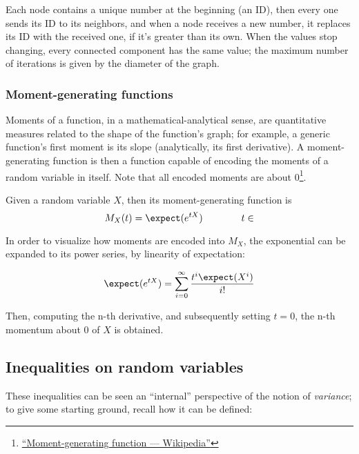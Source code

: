 \begin{example}
    Each node contains a unique number at the beginning (an ID), then every one sends its ID to its neighbors, and when a node receives a new number, it replaces its ID with the received one, if it's greater than its own. When the values stop changing, every connected component has the same value; the maximum number of iterations is given by the diameter of the graph.
\end{example}


\subsubsection{Moment-generating functions}
	
Moments of a function, in a mathematical-analytical sense, are quantitative measures related to the shape of the function's graph; for example, a generic function's first moment is its slope (analytically, its first derivative). A moment-generating function is then a function capable of encoding the moments of a random variable in itself. Note that all encoded moments are about 0\footnote{\linkicon \href{https://en.wikipedia.org/wiki/Moment-generating_function}{\textsf{``Moment-generating function --- Wikipedia''}}}.

\begin{definition} Given a random variable $X$, then its moment-generating function is
    \begin{equation}
        M_X(t) = \expect(e^{tX}) \qquad \qquad t \in \real
    \end{equation}
\end{definition}

In order to visualize how moments are encoded into $M_X$, the exponential can be expanded to its power series, by linearity of expectation:

\[
    \expect(e^{tX}) = \sum_{i = 0}^{\infty} \frac{t^i \expect(X^i)}{i!}
\]

Then, computing the n-th derivative, and subsequently setting $t = 0$, the n-th momentum about $0$ of $X$ is obtained.

\subsection{Inequalities on random variables}

These inequalities can be seen an ``internal'' perspective of the notion of \emph{variance}; to give some starting ground, recall how it can be defined:

